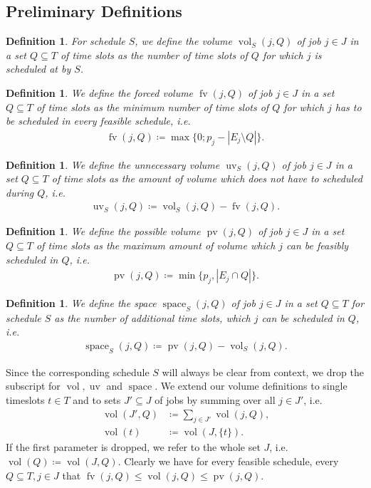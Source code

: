 \documentclass[a4paper]{article}
\DeclareMathOperator{\fv}{fv}
\DeclareMathOperator{\uv}{uv}
\DeclareMathOperator{\pv}{pv}
\DeclareMathOperator{\vol}{vol}
\DeclareMathOperator{\spac}{space}
\newtheorem{definition}[theorem]{Definition}
\begin{document}
\subsection{Preliminary Definitions}
\begin{definition}
  For schedule $S$, we define the \emph{volume $\vol_S(j, Q)$ of job $j \in J$ in a set $Q \subseteq T$ of time slots} as the number of time slots of $Q$ for which $j$ is scheduled at by $S$.
\end{definition}
\begin{definition}
  We define the \emph{forced volume} $\fv(j, Q)$ of job $j \in J$ in a set $Q \subseteq T$ of time slots as the minimum number of time slots of $Q$ for which $j$ has to be scheduled in every feasible schedule, i.e.
  \begin{align}
    \fv(j, Q) \coloneqq \max\{0; p_j - |E_j \setminus Q|\} \text{.}
  \end{align}
\end{definition}
\begin{definition}
  We define the \emph{unnecessary volume} $\uv_S(j, Q)$ of job $j \in J$ in a set $Q \subseteq T$ of time slots as the amount of volume which does not have to scheduled during $Q$, i.e.
  \begin{align}
    \uv_S(j, Q) \coloneqq \vol_S(j, Q) - \fv(j,Q)\text{.}
  \end{align}
\end{definition}
\begin{definition}
  We define the \emph{possible volume} $\pv(j, Q)$ of job $j \in J$ in a set $Q \subseteq T$ of time slots as the maximum amount of volume which $j$ can be feasibly scheduled in $Q$, i.e.
  \begin{align}
    \pv(j, Q) \coloneqq \min\{ p_j, | E_j \cap Q | \} \text{.}
  \end{align}
\end{definition}
\begin{definition}
  We define the \emph{space $\spac_S(j, Q)$ of job $j \in J$ in a set $Q \subseteq T$ for schedule $S$} as the number of additional time slots, which $j$ can be scheduled in $Q$, i.e.\
  \begin{align}
    \spac_S(j, Q) \coloneqq \pv(j, Q) - \vol_S(j, Q) \text{.}
  \end{align}
\end{definition}
Since the corresponding schedule $S$ will always be clear from context, we drop the subscript for $\vol, \uv$ and $\spac$.
We extend our volume definitions to single timeslots $t\in T$ and to sets $J' \subseteq J$ of jobs by summing over all $j \in J'$, i.e.
\begin{align}
  \vol(J', Q) &\coloneqq \sum_{j \in J'} \vol(j, Q)\text{,}
  \\
  \vol(t) &\coloneqq \vol(J, \{t\})\text{.}
\end{align}
If the first parameter is dropped, we refer to the whole set $J$, i.e.\ $\vol(Q) \coloneqq \vol(J, Q)$.
Clearly we have for every feasible schedule, every $Q \subseteq T, j \in J$ that $\fv(j, Q) \leq \vol(j, Q) \leq \pv(j, Q)$.
\end{document}
